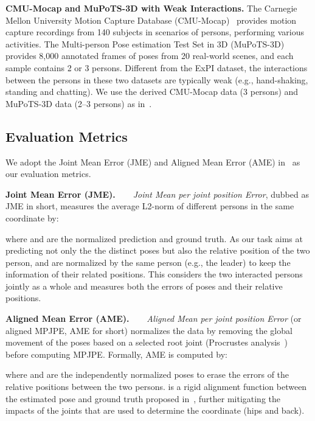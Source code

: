 \documentclass[10pt,twocolumn,letterpaper]{article}
\begin{document}
\vspace{1em}
\noindent\textbf{CMU-Mocap and MuPoTS-3D with Weak Interactions.}
The Carnegie Mellon University Motion Capture Database (CMU-Mocap)~\cite{cmumocap} provides motion capture recordings from 140 subjects in scenarios of  persons, performing various activities. 
The Multi-person Pose estimation Test Set in 3D (MuPoTS-3D)~\cite{mupots3d} provides 8,000 annotated frames of poses from 20 real-world scenes, and each sample contains 2 or 3 persons. 
Different from the ExPI dataset, the interactions between the persons in these two datasets are typically weak (e.g., hand-shaking, standing and chatting). 
We use the derived CMU-Mocap data (3 persons) and MuPoTS-3D data (2--3 persons) as in~\cite{wang2021multiperson}.


\subsection{Evaluation Metrics}
We adopt the Joint Mean Error (JME) and Aligned Mean Error (AME) in~\cite{guo2021multi} as our evaluation metrics. 

\vspace{1em}
\noindent\textbf{Joint Mean Error (JME).~~~} 
\textit{Joint Mean per joint position Error}, dubbed as JME in short, measures the average L2-norm of different persons in the same coordinate by: 
\vskip -0.1in

where  and  are the normalized prediction and ground truth. 
As our task aims at predicting not only the the distinct poses but also the relative position of the two person,  and  are normalized by the same person (e.g., the leader) to keep the information of their related positions. 
This considers the two interacted persons jointly as a whole and measures both the errors of poses and their relative positions.

\vspace{1em}
\noindent\textbf{Aligned Mean Error (AME).~~~} 
\textit{Aligned Mean per joint position Error} (or aligned MPJPE, AME for short) normalizes the data by removing the global movement of the poses based on a selected root joint (Procrustes analysis~\cite{gower1975generalized}) before computing MPJPE. 
Formally, AME is computed by:
\vskip -0.1in

where  and  are the independently normalized poses to erase the errors of the relative positions between the two persons. 
 is a rigid alignment function between the estimated pose and ground truth proposed in~\cite{gower1975generalized}, further mitigating the impacts of the joints that are used to determine the coordinate (hips and back). 
\end{document}
